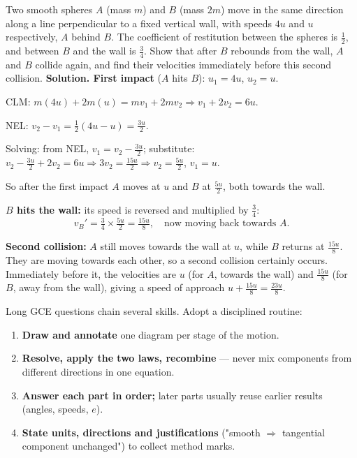 \documentclass[11pt]{article}
\newcounter{popsec}
\newcounter{popsub}
\newcommand{\courssub}[1]{%
  \stepcounter{popsub}%
  \par\vspace{9pt}\noindent{\popxbold\fontsize{11.5}{13}\selectfont\color{popink}{\color{poporange}\thepopsec.\thepopsub}\hspace{6pt}#1}\par\nopagebreak\vspace{4pt}
}
\begin{document}
\begin{exoresolu}
Two smooth spheres $A$ (mass $m$) and $B$ (mass $2m$) move in the same direction along a line perpendicular to a fixed vertical wall, with speeds $4u$ and $u$ respectively, $A$ behind $B$. The coefficient of restitution between the spheres is $\tfrac{1}{2}$, and between $B$ and the wall is $\tfrac{3}{4}$. Show that after $B$ rebounds from the wall, $A$ and $B$ collide again, and find their velocities immediately before this second collision.
\tcblower
\textbf{Solution. First impact} ($A$ hits $B$): $u_1 = 4u$, $u_2 = u$.

CLM: $m(4u) + 2m(u) = m v_1 + 2m v_2 \Rightarrow v_1 + 2v_2 = 6u$.

NEL: $v_2 - v_1 = \tfrac{1}{2}(4u - u) = \tfrac{3u}{2}$.

Solving: from NEL, $v_1 = v_2 - \tfrac{3u}{2}$; substitute: $v_2 - \tfrac{3u}{2} + 2v_2 = 6u \Rightarrow 3v_2 = \tfrac{15u}{2} \Rightarrow v_2 = \tfrac{5u}{2}$, $v_1 = u$.

So after the first impact $A$ moves at $u$ and $B$ at $\tfrac{5u}{2}$, both towards the wall.

\textbf{$B$ hits the wall:} its speed is reversed and multiplied by $\tfrac{3}{4}$:
\[ v_B' = \tfrac{3}{4}\times\tfrac{5u}{2} = \tfrac{15u}{8}, \quad \text{now moving back towards } A. \]

\textbf{Second collision:} $A$ still moves towards the wall at $u$, while $B$ returns at $\tfrac{15u}{8}$. They are moving towards each other, so a second collision certainly occurs. Immediately before it, the velocities are $u$ (for $A$, towards the wall) and $\tfrac{15u}{8}$ (for $B$, away from the wall), giving a speed of approach $u + \tfrac{15u}{8} = \tfrac{23u}{8}$.
\end{exoresolu}

\courssub{GCE-Style Synthesis Problem}

\begin{methode}
Long GCE questions chain several skills. Adopt a disciplined routine:
\begin{enumerate}
\item \textbf{Draw and annotate} one diagram per stage of the motion.
\item \textbf{Resolve, apply the two laws, recombine} — never mix components from different directions in one equation.
\item \textbf{Answer each part in order;} later parts usually reuse earlier results (angles, speeds, $e$).
\item \textbf{State units, directions and justifications} ("smooth $\Rightarrow$ tangential component unchanged") to collect method marks.
\end{enumerate}
\end{methode}
\end{document}
